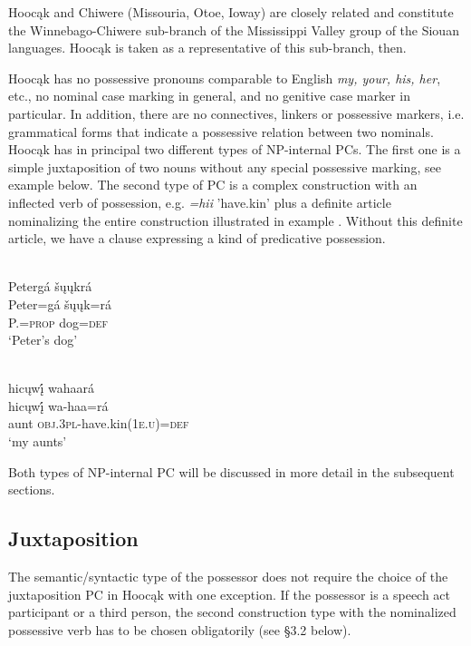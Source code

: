 \documentclass[output=paper]{LSP/langsci}
\begin{document}
Hoocąk and Chiwere (Missouria, Otoe, Ioway) are closely related and constitute the Winnebago-Chiwere sub-branch of the Mississippi Valley group of the Siouan languages. Hoocąk is taken as a representative of this sub-branch, then. 

Hoocąk has no possessive pronouns comparable to English \textit{my, your, his, her}, etc., no nominal case marking in general, and no genitive case marker in particular. In addition, there are no connectives, linkers or possessive markers, i.e. grammatical forms that indicate a possessive relation between two nominals. Hoocąk has in principal two different types of NP-internal PCs. The first one is a simple juxtaposition of two nouns without any special possessive marking, see example  below. The second type of PC is a complex construction with an inflected verb of possession, e.g. \textit{=hii} 'have.kin' plus a definite article nominalizing the entire construction illustrated in example . Without this definite article, we have a clause expressing a kind of predicative possession. 

\ea  \label{petersdog}
 {}{\citealt[16]{Helmbrecht2003}} \\
\ea
\glll Petergá šųųkrá\\
Peter=gá     šųųk=rá \\
P.=\textsc{prop}    dog=\textsc{def} \\
\glt `Peter's dog'

\ex	 \label{myaunts}
 {}{\citealt[19]{Helmbrecht2003}} \\
\glll hicųwį́ wahaará\\
hicųwį́  wa-haa=rá \\
aunt     \textsc{obj.3pl}-have.kin(\textsc{1e.u})=\textsc{def} \\
\glt `my aunts'
\z
\z

Both types of NP-internal PC will be discussed in more detail in the subsequent sections.

\subsection{Juxtaposition}

The semantic/syntactic type of the possessor does not require the choice of the juxtaposition PC in Hoocąk with one exception. If the possessor is a speech act participant or a third person, the second construction type with the nominalized possessive verb has to be chosen obligatorily (see §3.2 below).
\end{document}
